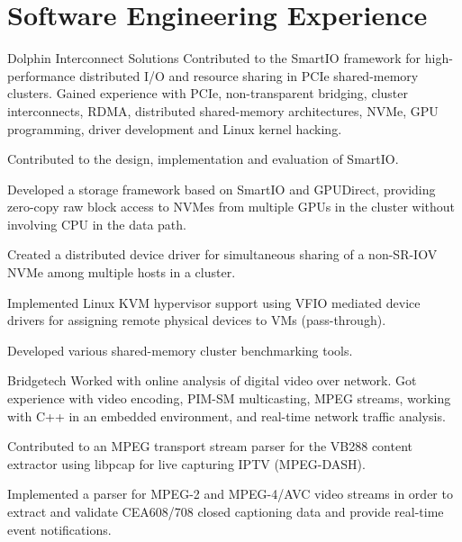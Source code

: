 \section{Software Engineering Experience}
\begin{experience}{Dolphin Interconnect Solutions}{
}
Contributed to the SmartIO framework for high-performance distributed I/O and resource sharing
in PCIe shared-memory clusters. 
Gained experience with PCIe, non-transparent bridging, cluster interconnects, RDMA, distributed shared-memory
architectures, NVMe, GPU programming, driver development and Linux kernel hacking.
\begin{contribs}
	\item{Contributed to the design, implementation and evaluation of SmartIO.}
	\item{Developed a storage framework based on SmartIO and GPUDirect, providing
		zero-copy raw block access to NVMes from multiple GPUs in the cluster without involving CPU in the data path.}
	\item{Created a distributed device driver for simultaneous sharing of a non-SR-IOV NVMe among multiple hosts in a cluster.}
	\item{Implemented Linux KVM hypervisor support using VFIO mediated device drivers
		for assigning remote physical devices to VMs (pass-through).}
	\item{Developed various shared-memory cluster benchmarking tools.}
\end{contribs}
\end{experience}

\begin{experience}{Bridgetech}{
}
Worked with online analysis of digital video over network.
Got experience with video encoding, PIM-SM multicasting, MPEG 
streams, working with C++ in an embedded environment, and
real-time network traffic analysis.

\begin{contribs}
	\item{Contributed to an MPEG transport stream parser for the VB288 content extractor using libpcap for live capturing
		IPTV (MPEG-DASH).}
	\item{Implemented a parser for MPEG-2 and MPEG-4/AVC video streams in order to extract and
		validate CEA608/708 closed captioning data and provide real-time event
		notifications.}
\end{contribs}
\end{experience}

